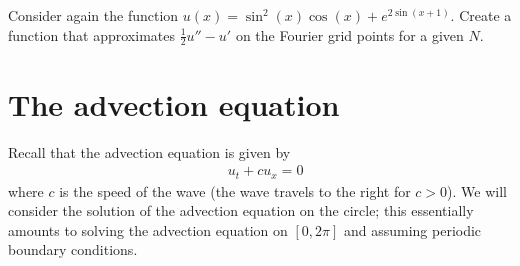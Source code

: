 \begin{problem}
Consider again the function $u(x) = \sin^2 (x) \cos(x) +e^{2\sin(x+1)}$.
Create a function that approximates $\frac{1}{2}u''-u'$ on the Fourier grid points for a given $N$.	
\end{problem}

% 
% 
% 



% 
% 
% 
% 


\section{The advection equation}
Recall that the advection equation is given by
\begin{align}
&{ }u_t + cu_x = 0
\end{align}
where $c$ is the speed of the wave (the wave travels to the right for $c > 0$).
We will consider the solution of the advection equation on the circle; this essentially amounts to solving the advection equation on $[0,2\pi]$ and assuming periodic boundary conditions. 

